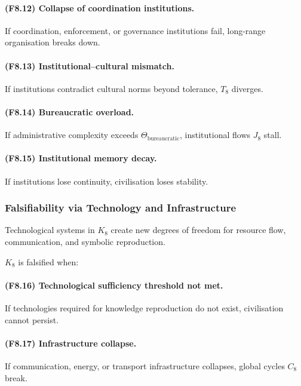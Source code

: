\paragraph{(F8.12) Collapse of coordination institutions.}
If coordination, enforcement, or governance institutions fail,
long-range organisation breaks down.

\paragraph{(F8.13) Institutional–cultural mismatch.}
If institutions contradict cultural norms beyond tolerance,
$T_8$ diverges.

\paragraph{(F8.14) Bureaucratic overload.}
If administrative complexity exceeds $\Theta_{\mathrm{bureaucratic}}$,
institutional flows $J_8$ stall.

\paragraph{(F8.15) Institutional memory decay.}
If institutions lose continuity, civilisation loses stability.



\subsubsection{Falsifiability via Technology and Infrastructure}

Technological systems in $K_8$ create new degrees of freedom
for resource flow, communication, and symbolic reproduction.

$K_8$ is falsified when:

\paragraph{(F8.16) Technological sufficiency threshold not met.}
If technologies required for knowledge reproduction do not exist,
civilisation cannot persist.

\paragraph{(F8.17) Infrastructure collapse.}
If communication, energy, or transport infrastructure collapses,
global cycles $C_8$ break.

